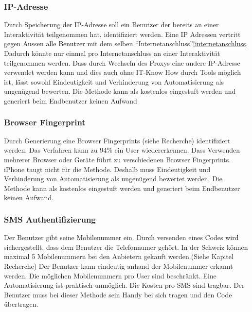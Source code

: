 \subsubsection{IP-Adresse}\label{ip-adresse}

Durch Speicherung der IP-Adresse soll ein Benutzer der bereits an einer
Interaktivität teilgenommen hat, identifiziert werden. Eine IP Adressen
vertritt gegen Aussen alle Benutzer mit dem selben
``Internetanschluss''\href{Der\%20Begriff\%20Internetanschluss\%20ist\%20schwamig\%20eingesetzt.}{!internetanschluss}.
Dadurch könnte nur einmal pro Internetanschluss an einer Interaktivität
teilgenommen werden. Dass durch Wechseln des Proxys eine andere
IP-Adresse verwendet werden kann und dies auch ohne IT-Know How durch
Tools möglich ist, lässt sowohl Eindeutigkeit und Verhinderung von
Automatisierung als ungenügend bewerten. Die Methode kann als kostenlos
eingestuft werden und generiert beim Endbenutzer keinen Aufwand

\subsubsection{Browser Fingerprint}\label{browser-fingerprint}

Durch Generierung eine Browser Fingerprints (siehe Recherche)
identifiziert werden. Das Verfahren kann zu 94\% ein User
wiedererkennen. Dass Verwenden mehrerer Browser oder Geräte führt zu
verschiedenen Browser Fingerprints. iPhone taugt nicht für die Methode.
Deshalb muss Eindeutigkeit und Verhinderung von Automatisierung als
ungenügend bewertet werden. Die Methode kann als kostenlos eingestuft
werden und generiert beim Endbenutzer keinen Aufwand.

\subsubsection{SMS Authentifizierung}\label{sms-authentifizierung}

Der Benutzer gibt seine Mobilenummer ein. Durch versenden eines Codes
wird sichergestellt, dass dem Benutzer die Telefonnumer gehört. In der
Schweiz können maximal 5 Mobilenummern bei den Anbietern gekauft
werden.(Siehe Kapitel Recherche) Der Benutzer kann eindeutig anhand der
Mobilenummer erkannt werden. Die möglichen Mobilenummern pro User sind
beschränkt. Eine Automatisierung ist praktisch unmöglich. Die Kosten pro
SMS sind tragbar. Der Benutzer muss bei dieser Methode sein Handy bei
sich tragen und den Code übertragen.


